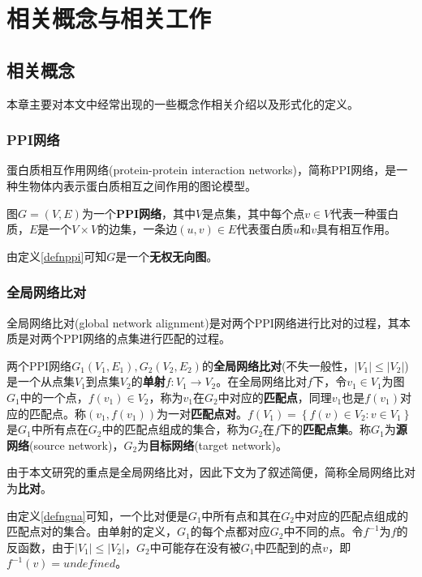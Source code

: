 \chapter{相关概念与相关工作}

\section{相关概念}
本章主要对本文中经常出现的一些概念作相关介绍以及形式化的定义。

\subsection{PPI网络}


蛋白质相互作用网络(protein-protein interaction networks)，简称PPI网络，是一种生物体内表示蛋白质相互之间作用的图论模型。
\begin{defn}[PPI网络]
\label{defnppi}
图$G=(V,E)$为一个\textbf{PPI网络}，其中$V$是点集，其中每个点$v\in V$代表一种蛋白质，$E$是一个$V×V$的边集，一条边$(u,v)\in E$代表蛋白质$u$和$v$具有相互作用。
\end{defn}
由定义\ref{defnppi}可知$G$是一个\textbf{无权无向图}。
\subsection{全局网络比对}
全局网络比对(global network alignment)是对两个PPI网络进行比对的过程，其本质是对两个PPI网络的点集进行匹配的过程。

\begin{defn}[全局网络比对]
\label{defngna}
两个PPI网络$G_1(V_1,E_1),G_2(V_2,E_2)$的\textbf{全局网络比对}(不失一般性，$|V_1|\leq|V_2|$)是一个从点集$V_1$到点集$V_2$的\textbf{单射}$f:V_1\rightarrow V_2$。在全局网络比对$f$下，令$v_1\in V_1$为图$G_1$中的一个点，$f(v_1)\in V_2$，称为$v_1$在$G_2$中对应的\textbf{匹配点}，同理$v_1$也是$f(v_1)$对应的匹配点。称$(v_1,f(v_1))$为一对\textbf{匹配点对}。$f(V_1)=\left\{f(v)\in V_2:v\in V_1\right\}$是$G_1$中所有点在$G_2$中的匹配点组成的集合，称为$G_2$在$f$下的\textbf{匹配点集}。称$G_1$为\textbf{源网络}(source network)，$G_2$为\textbf{目标网络}(target network)。
\end{defn}
由于本文研究的重点是全局网络比对，因此下文为了叙述简便，简称全局网络比对为\textbf{比对}。

由定义\ref{defngna}可知，一个比对便是$G_1$中所有点和其在$G_2$中对应的匹配点组成的匹配点对的集合。由单射的定义，$G_1$的每个点都对应$G_2$中不同的点。令$f^{-1}$为$f$的反函数，由于$|V_1|\leq|V_2|$，$G_2$中可能存在没有被$G_1$中匹配到的点$v$，即$f^{-1}(v)=undefined$。

